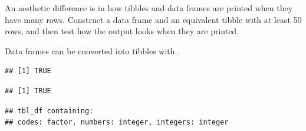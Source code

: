 \documentclass[krantz2]{krantz}\usepackage{knitr}%
\begin{document}
\begin{playground}
An aesthetic difference is in how tibbles and data frames are printed when they have many rows. Construct a data frame and an equivalent tibble with at least 50 rows, and then test how the output looks when they are printed.
\end{playground}

Data frames can be converted into tibbles with .

\begin{knitrout}\footnotesize
{}\color{fgcolor}\begin{kframe}
\begin{alltt}
 \hlkwb{<-} 
\end{alltt}


{\ttfamily\noindent\color{warningcolor}{\#\# Warning: `as.tibble()` is deprecated, use `as\_tibble()` (but mind the new semantics).\\\#\# This warning is displayed once per session.}}\begin{alltt}
\end{alltt}
\begin{verbatim}
## [1] TRUE
\end{verbatim}
\begin{alltt}
\end{alltt}
\begin{verbatim}
## [1] TRUE
\end{verbatim}
\begin{alltt}
\end{alltt}
\begin{verbatim}
## tbl_df containing:
## codes: factor, numbers: integer, integers: integer
\end{verbatim}
\end{kframe}
\end{knitrout}
\end{document}
